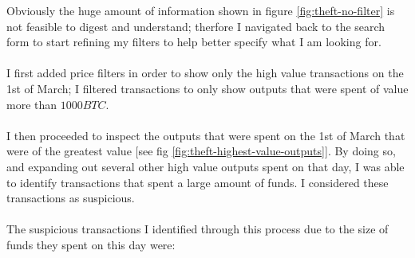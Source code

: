 Obviously the huge amount of information shown in figure \ref{fig:theft-no-filter} is not feasible to digest and understand; therfore I navigated back to the search form to start refining my filters to help better specify what I am looking for. 
\\\\
I first added price filters in order to show only the high value transactions on the 1st of March; I filtered transactions to only show outputs that were spent of value more than $1000BTC$. 
\\\\
I then proceeded to inspect the outputs that were spent on the 1st of March that were of the greatest value [see fig \ref{fig:theft-highest-value-outputs}]. By doing so, and expanding out several other high value outputs spent on that day, I was able to identify transactions that spent a large amount of funds. I considered these transactions as suspicious.
\\\\
The suspicious transactions I identified through this process due to the size of funds they spent on this day were:
